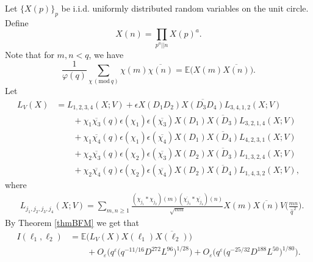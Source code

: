 \documentclass[12pt, reqno]{amsart}
\renewcommand{\pmod}[1]{\,(\mathrm{mod}\,#1)}
\newcommand{\E}{\mathbb{E}}
\numberwithin{equation}{section}
\numberwithin{theorem}{section}
\numberwithin{equation}{section}
\begin{document}
Let $\{X(p)\}_p$ be i.i.d. uniformly distributed random variables on the unit circle. Define
$$X(n) = \prod_{p^a||n}X(p)^a.$$
Note that for $m,n < q$, we have
\begin{equation} \frac{1}{\varphi(q)} \sum_{\chi \pmod q} \chi(m) \overline{\chi(n)}= \E \Big( X(m) \overline{X(n)}\Big). \label{orthogonality}
\end{equation}
Let
\begin{align*}
L_V(X) &= L_{1,2,3,4}(X;V)+\epsilon X(D_1D_2) \overline{X(D_3D_4)} L_{3,4,1,2}(X;V) \\
&\qquad+ \chi_1\overline{\chi_3}(q)\epsilon(\chi_1)\epsilon(\overline{\chi_3}) X(D_1) \overline{X(D_3)} L_{3,2,1,4}(X;V) \\
&\qquad+\chi_1\overline{\chi_4}(q)\epsilon(\chi_1)\epsilon(\overline{\chi_4}) X(D_1) \overline{X(D_4)}L_{4,2,3,1}(X;V)\\
&\qquad+\chi_2\overline{\chi_3}(q)\epsilon(\chi_2)\epsilon(\overline{\chi_3})X(D_2) \overline{X(D_3)} L_{1,3,2,4}(X;V)\\
&\qquad+\chi_2\overline{\chi_4}(q)\epsilon(\chi_2)\epsilon(\overline{\chi_4})X(D_2) \overline{X(D_4)}L_{1,4,3,2}(X;V),
\end{align*}
where 
\begin{align*}
 &  L_{j_1,j_2,j_3,j_4}(X;V)  =   \sum_{m,n \geq 1}\frac{(\chi_{j_1}*\chi_{j_2})(m)(\overline{\chi_{j_3}}*\overline{\chi_{j_4}})(n)}{\sqrt{mn}}X(m) \overline{X(n)} V\Big(\frac{mn}{\widehat{q}^{\,2}}\Big).
\end{align*}
By Theorem \ref{thmBFM} we get that 
\begin{align}\label{consequenceBFM}
    I(\ell_1,\ell_2) &= \E \Big( L_V(X) X(\ell_1) \overline{X(\ell_2)}\Big) \\
&\qquad+O_\varepsilon\Big(q^{\varepsilon}\big(q^{-11/16}D^{272}L^{96}\big)^{1/28}\Big)+O_\varepsilon\Big(q^{\varepsilon}\big(q^{-25/32}D^{188}L^{50}\big)^{1/80}\Big).\nonumber
\end{align}
\end{document}
